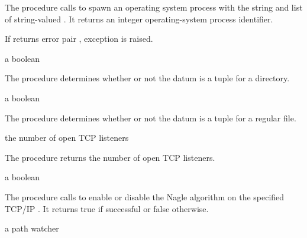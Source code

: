 The  procedure calls
 to spawn an operating system process with
the string  and list of string-valued .  It
returns an integer operating-system process identifier.

If  returns error pair , exception  is raised.

\begin{procedure}
\end{procedure}
\returns{} a boolean

The  procedure determines whether or not the
datum  is a  tuple for a directory.

\begin{procedure}
\end{procedure}
\returns{} a boolean

The  procedure determines whether or not the
datum  is a  tuple for a regular file.

\begin{procedure}
\end{procedure}
\returns{} the number of open TCP listeners

The  procedure returns the number of open TCP
listeners.

\begin{procedure}
\end{procedure}
\returns{} a boolean

The  procedure calls  to enable
or disable the Nagle algorithm on the specified TCP/IP .
It returns true if successful or false otherwise.

\begin{procedure}
\end{procedure}
\returns{} a path watcher

